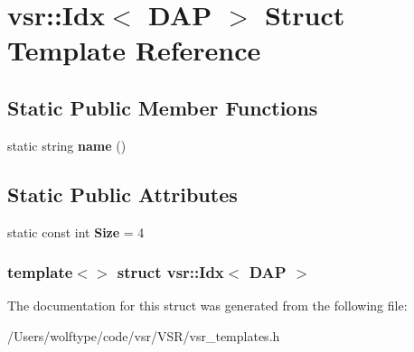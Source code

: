 \hypertarget{structvsr_1_1_idx_3_01_d_a_p_01_4}{\section{vsr\-:\-:Idx$<$ D\-A\-P $>$ Struct Template Reference}
\label{structvsr_1_1_idx_3_01_d_a_p_01_4}
}
\subsection*{Static Public Member Functions}
\begin{DoxyCompactItemize}
\item 
\hypertarget{structvsr_1_1_idx_3_01_d_a_p_01_4_aceaccb98356c4260eb61adee1b973086}{static string {\bfseries name} ()}\label{structvsr_1_1_idx_3_01_d_a_p_01_4_aceaccb98356c4260eb61adee1b973086}

\end{DoxyCompactItemize}
\subsection*{Static Public Attributes}
\begin{DoxyCompactItemize}
\item 
\hypertarget{structvsr_1_1_idx_3_01_d_a_p_01_4_ac47b648eece9b7d91ed93f3d28624840}{static const int {\bfseries Size} = 4}\label{structvsr_1_1_idx_3_01_d_a_p_01_4_ac47b648eece9b7d91ed93f3d28624840}

\end{DoxyCompactItemize}
\subsubsection*{template$<$$>$ struct vsr\-::\-Idx$<$ D\-A\-P $>$}



The documentation for this struct was generated from the following file\-:\begin{DoxyCompactItemize}
\item 
/\-Users/wolftype/code/vsr/\-V\-S\-R/vsr\-\_\-templates.\-h\end{DoxyCompactItemize}
